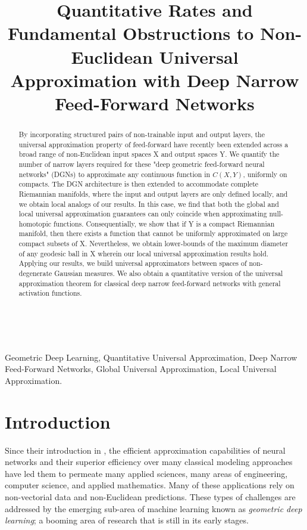\documentclass[anon,12pt]{colt2021} %
\title[%
%
Quantitative Non-Euclidean Universal Approximation]{
%
Quantitative Rates and Fundamental Obstructions to Non-Euclidean Universal Approximation with Deep Narrow Feed-Forward Networks
}
\begin{document}
\maketitle

\begin{abstract}
By incorporating structured pairs of non-trainable input and output layers, the universal approximation property of feed-forward have recently been extended across a broad range of non-Euclidean input spaces X and output spaces Y. We quantify the number of narrow layers required for these "deep geometric feed-forward neural networks" (DGNs) to approximate any continuous function in $C(X,Y)$, uniformly on compacts. The DGN architecture is then extended to accommodate complete Riemannian manifolds, where the input and output layers are only defined locally, and we obtain local analogs of our results. In this case, we find that both the global and local universal approximation guarantees can only coincide when approximating null-homotopic functions.  Consequentially, we show that if Y is a compact Riemannian manifold, then there exists a function that cannot be uniformly approximated on large compact subsets of X. Nevertheless, we obtain lower-bounds of the maximum diameter of any geodesic ball in X wherein our local universal approximation results hold.  Applying our results, we build universal approximators between spaces of non-degenerate Gaussian measures.  We also obtain a quantitative version of the universal approximation theorem for classical deep narrow feed-forward networks with general activation functions. 
\end{abstract}
\hfill\\
\begin{keywords}%
    Geometric Deep Learning, Quantitative Universal Approximation, Deep Narrow Feed-Forward Networks, Global Universal Approximation, Local Universal Approximation.   
\end{keywords}

\section{Introduction}
Since their introduction in \cite{mcculloch1943logical}, the efficient approximation capabilities of neural networks and their superior efficiency over many classical modeling approaches have led them to permeate many applied sciences, many areas of engineering, computer science, and applied mathematics.  Many of these applications rely on non-vectorial data and non-Euclidean predictions.  These types of challenges are addressed by the emerging sub-area of machine learning known as \textit{geometric deep learning}; a booming area of research that is still in its early stages.  
\end{document}
